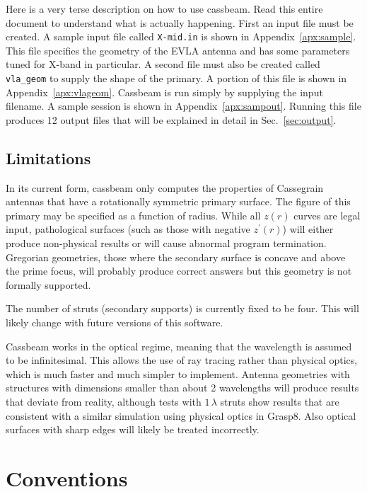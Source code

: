 \documentclass{article}
\begin{document}
Here is a very terse description on how to use cassbeam.  Read this entire
document to understand what is actually happening.  First an input file
must be created.  A sample input file called {\tt X-mid.in}
is shown in Appendix~\ref{apx:sample}.
This file specifies the geometry of the EVLA antenna and has some 
parameters tuned for X-band in particular.  A second file must also 
be created called {\tt vla\_geom} to supply the shape of the primary.  A
portion of this file is shown in Appendix~\ref{apx:vlageom}.
Cassbeam is run simply by supplying the input filename.  A sample 
session is shown in Appendix~\ref{apx:sampout}.
Running this file produces 12 output files that will be explained in
detail in Sec.~\ref{sec:output}.

\subsection{Limitations}

In its current form, cassbeam only computes the properties of Cassegrain
antennas that have a rotationally symmetric primary surface.  The figure of
this primary may be specified as a function of radius.  While all $z(r)$
curves are legal input, pathological surfaces (such as those with negative
$z^\prime(r)$) will either produce non-physical results or will cause
abnormal program termination.  Gregorian geometries, those where the
secondary surface is concave and above the prime focus, will probably produce
correct answers but this geometry is not formally supported.

The number of struts (secondary supports) is currently fixed to be four.
This will likely change with future versions of this software.

Cassbeam works in the optical regime, meaning that the wavelength is assumed
to be infinitesimal.  This allows the use of ray tracing rather than physical
optics, which is much faster and much simpler to implement.  
Antenna geometries with structures with dimensions smaller than about 2 
wavelengths will produce results that deviate from reality, although
tests with $1\,\lambda$ struts show results that are consistent with
a similar simulation using physical optics in Grasp8.  Also optical 
surfaces with sharp edges will likely be treated incorrectly.

\section{Conventions}
\end{document}

